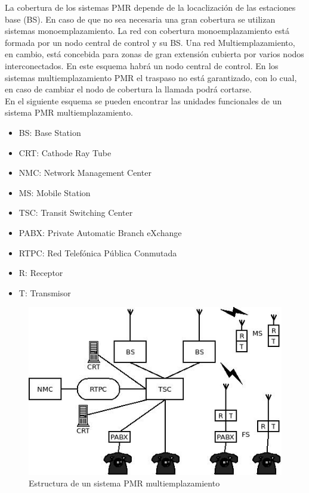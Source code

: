 La cobertura de los sistemas PMR depende de la locaclización de las estaciones base (BS). En caso de que no sea necesaria una gran cobertura se utilizan sistemas monoemplazamiento. La red con cobertura monoemplazamiento está formada por un nodo central de control y su BS. Una red Multiemplazamiento, en cambio, está concebida para zonas de gran extensión cubierta por varios nodos interconectados. En este esquema habrá un nodo central de control. En los sistemas multiemplazamiento PMR  el traspaso no está garantizado, con lo cual, en caso de cambiar el nodo de cobertura la llamada podrá cortarse.\\
	En el siguiente esquema se pueden encontrar las unidades funcionales de un sistema PMR multiemplazamiento.
\begin{itemize}
	\item 	BS: Base Station
	\item 	CRT: Cathode Ray Tube
	\item 	NMC: Network Management Center
	\item 	MS: Mobile Station
	\item 	TSC: Transit Switching Center
	\item 	PABX: Private Automatic Branch eXchange
	\item 	RTPC: Red Telefónica Pública Conmutada
	\item 	R: Receptor
	\item 	T: Transmisor
\end{itemize}
\begin{figure}[htp]
\centering
\includegraphics[width=\textwidth]{Imagen/diaPMR.jpg}
\caption{Estructura de un sistema PMR  multiemplazamiento}
\label{img:diaPMR}
\end{figure}
